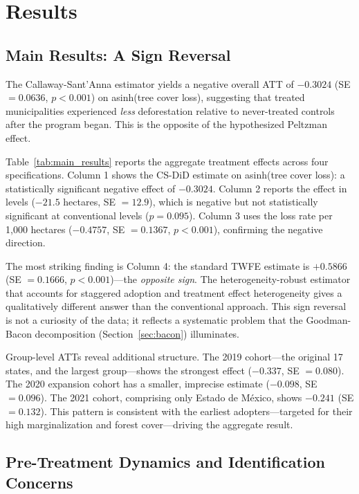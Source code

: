 \documentclass[12pt]{article}
\begin{document}
\section{Results}
\label{sec:results}

\subsection{Main Results: A Sign Reversal}

The Callaway-Sant'Anna estimator yields a negative overall ATT of $-0.3024$ (SE $= 0.0636$, $p < 0.001$) on asinh(tree cover loss), suggesting that treated municipalities experienced \textit{less} deforestation relative to never-treated controls after the program began. This is the opposite of the hypothesized Peltzman effect.



Table~\ref{tab:main_results} reports the aggregate treatment effects across four specifications. Column 1 shows the CS-DiD estimate on asinh(tree cover loss): a statistically significant negative effect of $-0.3024$. Column 2 reports the effect in levels ($-21.5$ hectares, SE $= 12.9$), which is negative but not statistically significant at conventional levels ($p = 0.095$). Column 3 uses the loss rate per 1,000 hectares ($-0.4757$, SE $= 0.1367$, $p < 0.001$), confirming the negative direction.

The most striking finding is Column 4: the standard TWFE estimate is $+0.5866$ (SE $= 0.1666$, $p < 0.001$)---the \textit{opposite sign}. The heterogeneity-robust estimator that accounts for staggered adoption and treatment effect heterogeneity gives a qualitatively different answer than the conventional approach. This sign reversal is not a curiosity of the data; it reflects a systematic problem that the Goodman-Bacon decomposition (Section~\ref{sec:bacon}) illuminates.

Group-level ATTs reveal additional structure. The 2019 cohort---the original 17 states, and the largest group---shows the strongest effect ($-0.337$, SE $= 0.080$). The 2020 expansion cohort has a smaller, imprecise estimate ($-0.098$, SE $= 0.096$). The 2021 cohort, comprising only Estado de M\'{e}xico, shows $-0.241$ (SE $= 0.132$). This pattern is consistent with the earliest adopters---targeted for their high marginalization and forest cover---driving the aggregate result.

\subsection{Pre-Treatment Dynamics and Identification Concerns}
\end{document}
